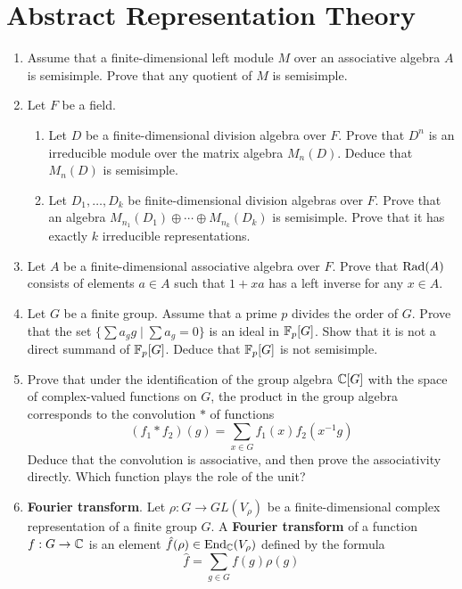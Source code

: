 \documentclass[../psets.tex]{subfiles}
\begin{document}
\section{Abstract Representation Theory}
\begin{enumerate}
    \item {}Assume that a finite-dimensional left module $M$ over an associative algebra $A$ is semisimple. Prove that any quotient of $M$ is semisimple.
    \item Let $F$ be a field.
    \begin{enumerate}
        \item Let $D$ be a finite-dimensional division algebra over $F$. Prove that $D^n$ is an irreducible module over the matrix algebra $M_n(D)$. Deduce that $M_n(D)$ is semisimple.
        \item Let $D_1,\dots,D_k$ be finite-dimensional division algebras over $F$. Prove that an algebra $M_{n_1}(D_1)\oplus\cdots\oplus M_{n_k}(D_k)$ is semisimple. Prove that it has exactly $k$ irreducible representations.
    \end{enumerate}
    \item Let $A$ be a finite-dimensional associative algebra over $F$. Prove that $\operatorname{Rad}(A)$ consists of elements $a\in A$ such that $1+xa$ has a left inverse for any $x\in A$.
    \item Let $G$ be a finite group. Assume that a prime $p$ divides the order of $G$. Prove that the set $\{\sum a_gg\mid\sum a_g=0\}$ is an ideal in $\mathbb{F}_p[G]$. Show that it is not a direct summand of $\mathbb{F}_p[G]$. Deduce that $\mathbb{F}_p[G]$ is not semisimple.
    \item Prove that under the identification of the group algebra $\mathbb{C}[G]$ with the space of complex-valued functions on $G$, the product in the group algebra corresponds to the convolution $*$ of functions
    \begin{equation*}
        (f_1*f_2)(g) = \sum_{x\in G}f_1(x)f_2(x^{-1}g)
    \end{equation*}
    Deduce that the convolution is associative, and then prove the associativity directly. Which function plays the role of the unit?
    \item \textbf{Fourier transform}. Let $\rho:G\to GL(V_\rho)$ be a finite-dimensional complex representation of a finite group $G$. A \textbf{Fourier transform} of a function $f:G\to\mathbb{C}$ is an element $\hat{f}(\rho)\in\operatorname{End}_{\mathbb{C}}(V_\rho)$ defined by the formula
    \begin{equation*}
        \hat{f} = \sum_{g\in G}f(g)\rho(g)

\end{equation*}
\end{enumerate}
\end{document}
